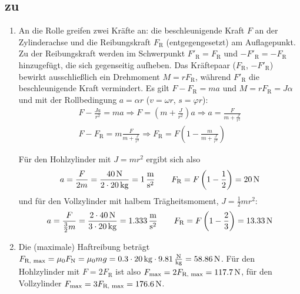 \documentclass[a4paper]{scrartcl}
\begin{document}
\subsection{zu }
\label{lsg:WalzeFlach}
\begin{enumerate}[noitemsep]
  \item 
An die Rolle greifen zwei Kräfte an: die beschleunigende Kraft $F$ an der Zylinderachse und die Reibungskraft $F_\text{R}$ (entgegengesetzt) am Auflagepunkt. Zu der Reibungskraft werden im Schwerpunkt $F'_\text{R} = F_\text{R}$ und $-F'_\text{R} = -F_\text{R}$ hinzugefügt, die sich gegenseitig aufheben. Das Kräftepaar ($F_\text{R}$, $-F'_\text{R}$) bewirkt ausschließlich ein Drehmoment $M = rF_\text{R}$, während $F'_\text{R}$ die beschleunigende Kraft vermindert. Es gilt $F - F_\text{R} = ma$ und $M = rF_\text{R} = J\alpha$ und mit der Rollbedingung $a = \alpha r$ ($v = \omega r$, $s = \varphi r$):
\begin{align*}
  F - \frac{Ja}{r^2} = ma \Rightarrow F = \left( m+\frac{J}{r^2} \right)a \Rightarrow a = \frac{F}{m+\frac{J}{r^2}} \\
  F - F_\text{R} = m \frac{F}{m+\frac{J}{r^2}} \Rightarrow F_\text{R} = F \left( 1-\frac{m}{m+\frac{J}{r^2}} \right)
\end{align*}

Für den Hohlzylinder mit $J = mr^2$ ergibt sich also
\begin{align*}
  a = \frac{F}{2m} = \frac{\unit[40]{N}}{2 \cdot \unit[20]{kg}} = \unit[1]{\frac{m}{s^2}} \qquad F_\text{R} = F\left( 1-\frac{1}{2} \right) = \unit[20]{N}
\end{align*}
und für den Vollzylinder mit halbem Trägheitsmoment, $J = \frac{1}{2}mr^2$:
\begin{align*}
  a = \frac{F}{\frac{3}{2}m} = \frac{2 \cdot \unit[40]{N}}{3 \cdot \unit[20]{kg}} = \unit[1.333]{\frac{m}{s^2}} \qquad F_\text{R} = F\left( 1-\frac{2}{3} \right) = \unit[13.33]{N}
\end{align*}

  \item 
    Die (maximale) Haftreibung beträgt $F_\text{R, max} = \mu_0F_\text{N} = \mu_0mg = 0.3 \cdot \unit[20]{kg} \cdot \unit[9.81]{\frac{N}{kg}} = \unit[58.86]{N}$. Für den Hohlzylinder mit $F = 2F_\text{R}$ ist also $F_\text{max} = 2F_\text{R, max} = \unit[117.7]{N}$, für den Vollzylinder $F_\text{max} = 3F_\text{R, max} = \unit[176.6]{N}$.


\end{enumerate}
\end{document}
